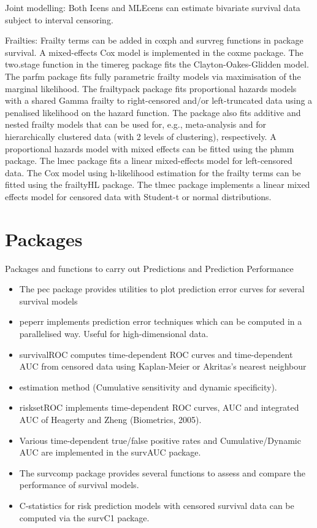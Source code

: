 \documentclass[11pt]{article} %
\begin{document}
Joint modelling: Both Icens and MLEcens can estimate bivariate survival data subject to interval censoring. 

Frailties: Frailty terms can be added in coxph and survreg functions in package survival. A mixed-effects Cox model is implemented in the coxme package. The two.stage function in the timereg package fits the Clayton-Oakes-Glidden model. The parfm package fits fully parametric frailty models via maximisation of the marginal likelihood. The frailtypack package fits proportional hazards models with a shared Gamma frailty to right-censored and/or left-truncated data using a penalised likelihood on the hazard function. The package also fits additive and nested frailty models that can be used for, e.g., meta-analysis and for hierarchically clustered data (with 2 levels of clustering), respectively. A proportional hazards model with mixed effects can be fitted using the phmm package. The lmec package fits a linear mixed-effects model for left-censored data. The Cox model using h-likelihood estimation for the frailty terms can be fitted using the frailtyHL package. The tlmec package implements a linear mixed effects model for censored data with Student-t or normal distributions. 
\section{Packages} 

Packages and functions to carry out Predictions and Prediction Performance 
\begin{itemize}
\item The pec package provides utilities to plot prediction error curves for several survival models 
\item peperr implements prediction error techniques which can be computed in a parallelised way. Useful for high-dimensional data. 
\item survivalROC computes time-dependent ROC curves and time-dependent AUC from censored data using Kaplan-Meier or Akritas's nearest neighbour \item estimation method (Cumulative sensitivity and dynamic specificity). 
\item risksetROC implements time-dependent ROC curves, AUC and integrated AUC of Heagerty and Zheng (Biometrics, 2005). 
\item Various time-dependent true/false positive rates and Cumulative/Dynamic AUC are implemented in the survAUC package. 
\item The survcomp package provides several functions to assess and compare the performance of survival models. 
\item C-statistics for risk prediction models with censored survival data can be computed via the survC1 package. 
\end{itemize}
\newpage
\end{document}
